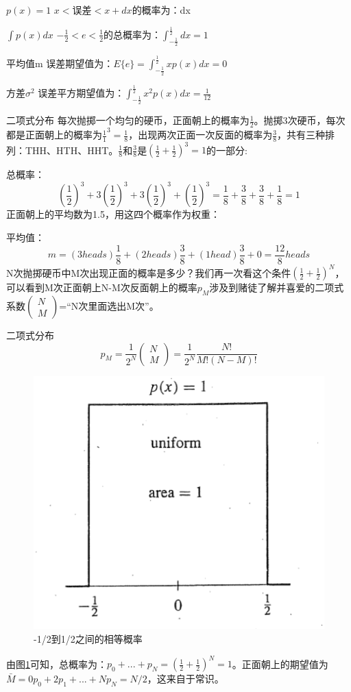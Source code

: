 	$p(x)=1$      \qquad $x<$误差$<x+dx$的概率为：dx
	
	$\int p(x)dx$   \qquad $-\frac{1}{2}<e<\frac{1}{2}$的总概率为：$\int^{\frac{1}{2}}_{-\frac{1}{2}}dx=1$
	
	平均值m         \qquad 误差期望值为：$E\{e\}=\int^{\frac{1}{2}}_{-\frac{1}{2}}xp(x)dx=0$
	
	方差$\sigma^2$  \qquad 误差平方期望值为：$\int^{\frac{1}{2}}_{-\frac{1}{2}} x^2 p(x)dx=\frac{1}{12}$
	
	二项式分布  
	\quad 每次抛掷一个均匀的硬币，正面朝上的概率为$\frac{1}{2}$。抛掷3次硬币，每次都是正面朝上的概率为$\frac{1}{1}^{3}=\frac{1}{8}$，出现两次正面一次反面的概率为$\frac{3}{8}$，共有三种排列：THH、HTH、HHT。$\frac{1}{8}$和$\frac{3}{8}$是$(\frac{1}{2}+\frac{1}{2})^{3}=1$的一部分:
	
	总概率：
	\begin{equation*}
	(\frac{1}{2})^{3}+3(\frac{1}{2})^{3}+3(\frac{1}{2})^{3}+(\frac{1}{2})^{3}=\frac{1}{8}+\frac{3}{8}+\frac{3}{8}+\frac{1}{8}=1
	\end{equation*}
	正面朝上的平均数为1.5，用这四个概率作为权重：
	
	平均值：
	\begin{equation*}
	m=(3heads)\frac{1}{8}+(2heads)\frac{3}{8}+(1head)\frac{3}{8}+0=\frac{12}{8}heads
	\end{equation*}
	N次抛掷硬币中M次出现正面的概率是多少？我们再一次看这个条件$(\frac{1}{2}+\frac{1}{2})^{N}$，可以看到M次正面朝上N-M次反面朝上的概率$p_M$涉及到赌徒了解并喜爱的二项式系数$\begin{pmatrix}
		N \\ M
	\end{pmatrix}$=“N次里面选出M次”。
	
	二项式分布
	\begin{equation*}
	p_M = \frac{1}{2^N}
	\begin{pmatrix}
	N \\ M
	\end{pmatrix}
	=\frac{1}{2^N}\frac{N!}{M!(N-M)!}
	\end{equation*}	
	\begin{figure}
		\centering
		\includegraphics[width=0.7\linewidth]{TeX_files/Part02/chapter04/image/4-2}
		\caption{-1/2到1/2之间的相等概率}
		\label{fig:4-2}
	\end{figure}	
	由图\ref{fig:4-2}可知，总概率为：$p_0+...+p_N=(\frac{1}{2}+\frac{1}{2})^N=1$。正面朝上的期望值为$\bar{M}=0p_0+2p_1+...+Np_N=N/2$，这来自于常识。
	
